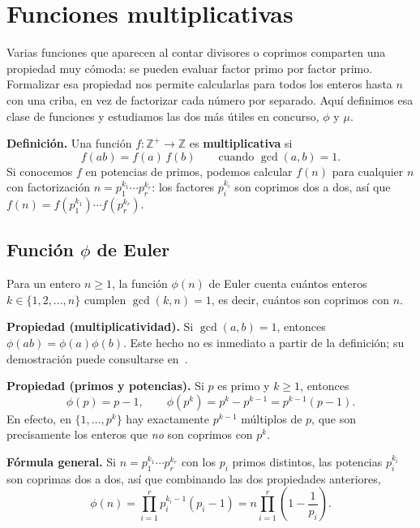 
\section{Funciones multiplicativas\adv}

Varias funciones que aparecen al contar divisores o coprimos comparten una propiedad muy cómoda: se pueden evaluar factor primo por factor primo. Formalizar esa propiedad nos permite calcularlas para todos los enteros hasta $n$ con una criba, en vez de factorizar cada número por separado. Aquí definimos esa clase de funciones y estudiamos las dos más útiles en concurso, $\phi$ y $\mu$.

\textbf{Definición.} Una función $f: \mathbb{Z}^+ \to \mathbb{Z}$ es \textbf{multiplicativa} si
\[
f(ab) = f(a)\,f(b) \qquad \text{cuando } \gcd(a,b)=1.
\]
Si conocemos $f$ en potencias de primos, podemos calcular $f(n)$ para cualquier $n$ con factorización $n = p_1^{k_1}\cdots p_r^{k_r}$: los factores $p_i^{k_i}$ son coprimos dos a dos, así que $f(n) = f(p_1^{k_1})\cdots f(p_r^{k_r})$.

\subsection*{Función $\phi$ de Euler}

Para un entero $n \ge 1$, la función $\phi(n)$ de Euler cuenta cuántos enteros $k \in \{1,2,\ldots,n\}$ cumplen $\gcd(k,n)=1$, es decir, cuántos son coprimos con $n$.

\textbf{Propiedad (multiplicatividad).} Si $\gcd(a,b)=1$, entonces $\phi(ab)=\phi(a)\phi(b)$. Este hecho no es inmediato a partir de la definición; su demostración puede consultarse en~\cite{cpalgos_phi}.

\textbf{Propiedad (primos y potencias).} Si $p$ es primo y $k\ge 1$, entonces~\cite{cpalgos_phi}
\[
\phi(p) = p-1, \qquad \phi(p^k) = p^k - p^{k-1} = p^{k-1}(p-1).
\]
En efecto, en $\{1,\ldots,p^k\}$ hay exactamente $p^{k-1}$ múltiplos de $p$, que son precisamente los enteros que \emph{no} son coprimos con $p^k$.

\textbf{Fórmula general.} Si $n = p_1^{k_1}\cdots p_r^{k_r}$ con los $p_i$ primos distintos, las potencias $p_i^{k_i}$ son coprimas dos a dos, así que combinando las dos propiedades anteriores,
\[
\phi(n) = \prod_{i=1}^{r} p_i^{k_i-1}(p_i-1) = n\prod_{i=1}^{r}\left(1-\frac{1}{p_i}\right).
\]

